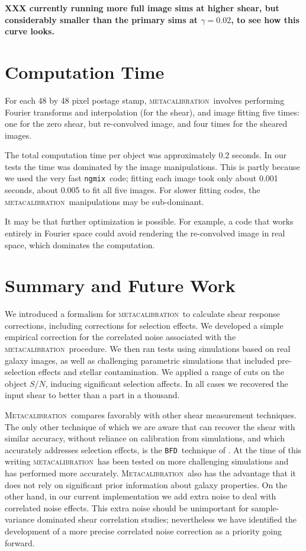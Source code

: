 \documentclass[iop]{emulateapj}
\newcommand{\snr}{$S/N$}
\newcommand{\mcal}{\textsc{metacalibration}}
\newcommand{\Mcal}{\textsc{Metacalibration}}
\newcommand{\ngmix}{\texttt{ngmix}}
\newcommand{\bfd}{\texttt{BFD}}
\begin{document}
{\bf XXX currently running more full image sims at higher shear, but considerably
smaller than the primary sims at $\gamma=0.02$, to see
how this curve looks.}

\section{Computation Time}

For each 48 by 48 pixel postage stamp, \mcal\ involves performing Fourier
transforms and interpolation (for the shear), and image fitting five times: one
for the zero shear, but re-convolved image, and four times for the sheared
images.

The total computation time per object was approximately 0.2 seconds.  In our
tests the time was dominated by the image manipulations.  This is partly
because we used the very fast \ngmix\ code; fitting each image took only about
0.001 seconds, about 0.005 to fit all five images.  For slower fitting codes,
the \mcal\ manipulations may be sub-dominant.

It may be that further optimization is possible.  For example, a code that
works entirely in Fourier space could avoid rendering the re-convolved image in
real space, which dominates the computation.

\section{Summary and Future Work} \label{sec:summary}

We introduced a formalism for \mcal\ to calculate shear response corrections,
including corrections for selection effects. We developed a simple empirical
correction for the correlated noise associated with the \mcal\ procedure.  We
then ran tests using simulations based on real galaxy images, as well as
challenging parametric simulations that included pre-selection effects and
stellar contamination.  We applied a range of cuts on the object \snr, inducing
significant selection affects.  In all cases we recovered the input shear to
better than a part in a thousand.

\Mcal\ compares favorably with other shear measurement techniques.  The only
other technique of which we are aware that can recover the shear with similar
accuracy, without reliance on calibration from simulations, and which
accurately addresses selection effects, is the \bfd\ technique of
\cite{bfd2016}.  At the time of this writing \mcal\ has been tested on more
challenging simulations and has performed more accurately.  \Mcal\ also has the
advantage that it does not rely on significant prior information about galaxy
properties.  On the other hand, in our current implementation we add extra
noise to deal with correlated noise effects.  This extra noise should be
unimportant for sample-variance dominated shear correlation studies;
nevertheless we have identified the development of a more precise correlated
noise correction as a priority going forward.
\end{document}
